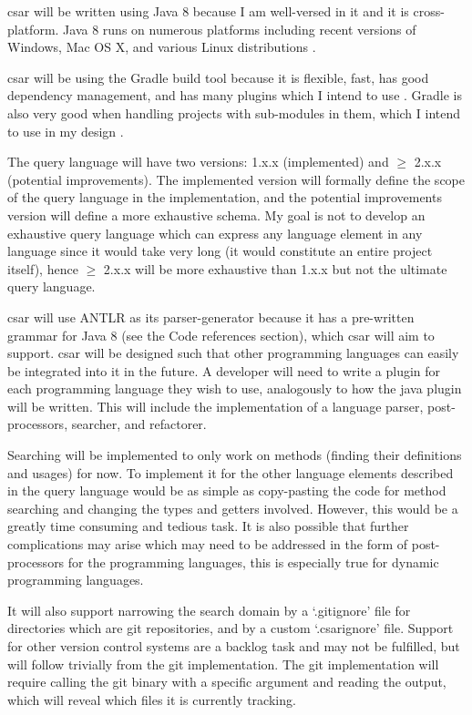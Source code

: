 \documentclass[12pt, letterpaper]{article}
\begin{document}
csar will be written using Java 8 because I am well-versed in it and it is cross-platform.
Java 8 runs on numerous platforms including recent versions of Windows, Mac OS X, and various Linux distributions \autocite{javasysreqs}.

csar will be using the Gradle build tool because it is flexible, fast, has good dependency management, and has many plugins which I intend to use \autocite{gradlevsmaven}.
Gradle is also very good when handling projects with sub-modules in them, which I intend to use in my design \autocite{drdobbswhyusegradle}.

The query language will have two versions: 1.x.x (implemented) and $ \geq $ 2.x.x (potential improvements).
The implemented version will formally define the scope of the query language in the implementation, and the potential improvements version will define a more exhaustive schema.
My goal is not to develop an exhaustive query language which can express any language element in any language since it would take very long (it would constitute an entire project itself), hence $ \geq $ 2.x.x will be more exhaustive than 1.x.x but not the ultimate query language.

csar will use ANTLR as its parser-generator because it has a pre-written grammar for Java 8 (see the Code references section), which csar will aim to support.
csar will be designed such that other programming languages can easily be integrated into it in the future.
A developer will need to write a plugin for each programming language they wish to use, analogously to how the java plugin will be written.
This will include the implementation of a language parser, post-processors, searcher, and refactorer.

Searching will be implemented to only work on methods (finding their definitions and usages) for now.
To implement it for the other language elements described in the query language would be as simple as copy-pasting the code for method searching and changing the types and getters involved.
However, this would be a greatly time consuming and tedious task.
It is also possible that further complications may arise which may need to be addressed in the form of post-processors for the programming languages, this is especially true for dynamic programming languages.

It will also support narrowing the search domain by a `.gitignore' file for directories which are git repositories, and by a custom `.csarignore' file.
Support for other version control systems are a backlog task and may not be fulfilled, but will follow trivially from the git implementation.
The git implementation will require calling the git binary with a specific argument and reading the output, which will reveal which files it is currently tracking.
\end{document}
